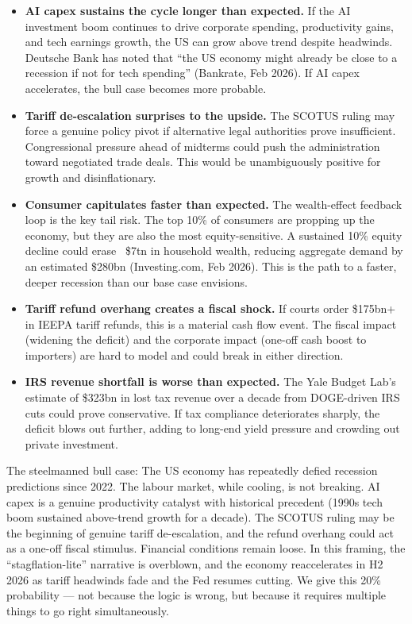 \documentclass{wilson-report}
\begin{document}
\begin{itemize}[leftmargin=1.2em, itemsep=4pt]
  \item \textbf{AI capex sustains the cycle longer than expected.} If the AI investment boom continues to drive corporate spending, productivity gains, and tech earnings growth, the US can grow above trend despite headwinds. Deutsche Bank has noted that ``the US economy might already be close to a recession if not for tech spending'' (Bankrate, Feb 2026). If AI capex accelerates, the bull case becomes more probable.
  \item \textbf{Tariff de-escalation surprises to the upside.} The SCOTUS ruling may force a genuine policy pivot if alternative legal authorities prove insufficient. Congressional pressure ahead of midterms could push the administration toward negotiated trade deals. This would be unambiguously positive for growth and disinflationary.
  \item \textbf{Consumer capitulates faster than expected.} The wealth-effect feedback loop is the key tail risk. The top 10\% of consumers are propping up the economy, but they are also the most equity-sensitive. A sustained 10\% equity decline could erase ~\$7tn in household wealth, reducing aggregate demand by an estimated \$280bn (Investing.com, Feb 2026). This is the path to a faster, deeper recession than our base case envisions.
  \item \textbf{Tariff refund overhang creates a fiscal shock.} If courts order \$175bn+ in IEEPA tariff refunds, this is a material cash flow event. The fiscal impact (widening the deficit) and the corporate impact (one-off cash boost to importers) are hard to model and could break in either direction.
  \item \textbf{IRS revenue shortfall is worse than expected.} The Yale Budget Lab's estimate of \$323bn in lost tax revenue over a decade from DOGE-driven IRS cuts could prove conservative. If tax compliance deteriorates sharply, the deficit blows out further, adding to long-end yield pressure and crowding out private investment.
\end{itemize}

The steelmanned bull case: The US economy has repeatedly defied recession predictions since 2022. The labour market, while cooling, is not breaking. AI capex is a genuine productivity catalyst with historical precedent (1990s tech boom sustained above-trend growth for a decade). The SCOTUS ruling may be the beginning of genuine tariff de-escalation, and the refund overhang could act as a one-off fiscal stimulus. Financial conditions remain loose. In this framing, the ``stagflation-lite'' narrative is overblown, and the economy reaccelerates in H2 2026 as tariff headwinds fade and the Fed resumes cutting. We give this 20\% probability --- not because the logic is wrong, but because it requires multiple things to go right simultaneously.
\end{document}
